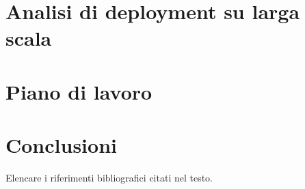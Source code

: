 \documentclass[12pt]{article}
\begin{document}

\section{Analisi di deployment su larga scala}



\newpage



\section{Piano di lavoro}



\newpage



\section{Conclusioni}



\newpage

\begin{thebibliography}
    Elencare i riferimenti bibliografici citati nel testo.
\end{thebibliography}

\end{document}
